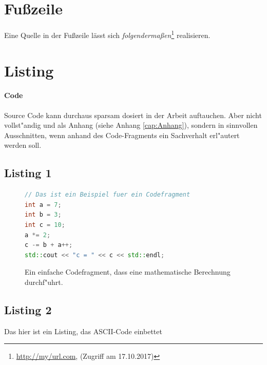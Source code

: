 \section{Fu{\ss}zeile}
\label{sec:Fusszeile}


Eine Quelle in der Fußzeile lässt sich \textit{folgendermaßen}\footnote{\url{http://my/url.com}, (Zugriff am 17.10.2017)} realisieren.


\section{Listing}
\label{sec:Listing}

\paragraph{Code}
Source Code kann durchaus sparsam dosiert in der Arbeit auftauchen.
Aber nicht vollst"andig und als Anhang (siehe Anhang \ref{cap:Anhang}), sondern in sinnvollen Ausschnitten, wenn anhand des Code-Fragments ein Sachverhalt erl"autert werden soll.

\subsection{Listing 1}
\label{subsec:Listing1}

\FloatBarrier
\begin{figure}[htb]
\begin{lstlisting}[language=C++, breaklines=true, basicstyle=\small, numbers=none]
// Das ist ein Beispiel fuer ein Codefragment
int a = 7;
int b = 3;
int c = 10;
a *= 2;
c -= b + a++;
std::cout << "c = " << c << std::endl;
\end{lstlisting}
  \caption[Beispiel eines einfachesn Codefragments.]{Ein einfache Codefragment, dass eine mathematische Berechnung durchf"uhrt.}
\label{lst:Codefragment}
\end{figure}


\subsection{Listing 2}
\label{subsec:Listing 2}

Das hier ist ein Listing, das ASCII-Code einbettet

